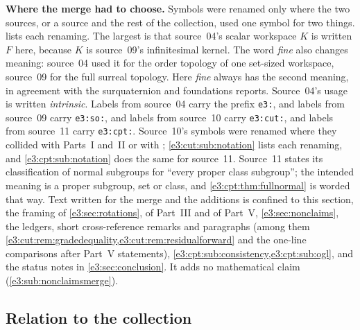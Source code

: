 \documentclass[11pt,letterpaper]{article}
\numberwithin{equation}{section}
\theoremstyle{definition}
\theoremstyle{remark}
\begin{document}
\textbf{Where the merge had to choose.} Symbols were renamed only where the
two sources, or a source and the rest of the collection, used one symbol for
two things.  lists each renaming. The largest is that
source~04's scalar workspace $K$ is written $F$ here, because $K$ is source~09's
infinitesimal kernel. The word \emph{fine} also changes meaning: source~04 used
it for the order topology of one set-sized workspace, source~09 for the full
surreal topology. Here \emph{fine} always has the second meaning, in agreement
with the surquaternion and foundations reports. Source~04's usage is written
\emph{intrinsic}. Labels from source~04 carry the prefix \texttt{e3:}, and
labels from source~09 carry \texttt{e3:so:}, and labels from source~10 carry
\texttt{e3:cut:}, and labels from source~11 carry \texttt{e3:cpt:}. Source~10's
symbols were renamed where they collided with Parts~I and~II or with
; \cref{e3:cut:sub:notation} lists each renaming, and
\cref{e3:cpt:sub:notation} does the same for source~11. Source~11 states its
classification of normal subgroups for ``every proper class subgroup''; the
intended meaning is a proper subgroup, set or class, and
\cref{e3:cpt:thm:fullnormal} is worded that way. Text written for the merge and
the additions is confined to this section, the framing of
\cref{e3:sec:rotations}, of Part~III and of Part~V, \cref{e3:sec:nonclaims}, the
ledgers, short cross-reference remarks and paragraphs (among them
\cref{e3:cut:rem:gradedequality,e3:cut:rem:residualforward} and the one-line
comparisons after Part~V statements),
\cref{e3:cpt:sub:consistency,e3:cpt:sub:ogl}, and the status notes in
\cref{e3:sec:conclusion}. It adds no mathematical claim
(\cref{e3:sub:nonclaimsmerge}).

\subsection{Relation to the collection}\label{e3:sub:collection}
\end{document}
